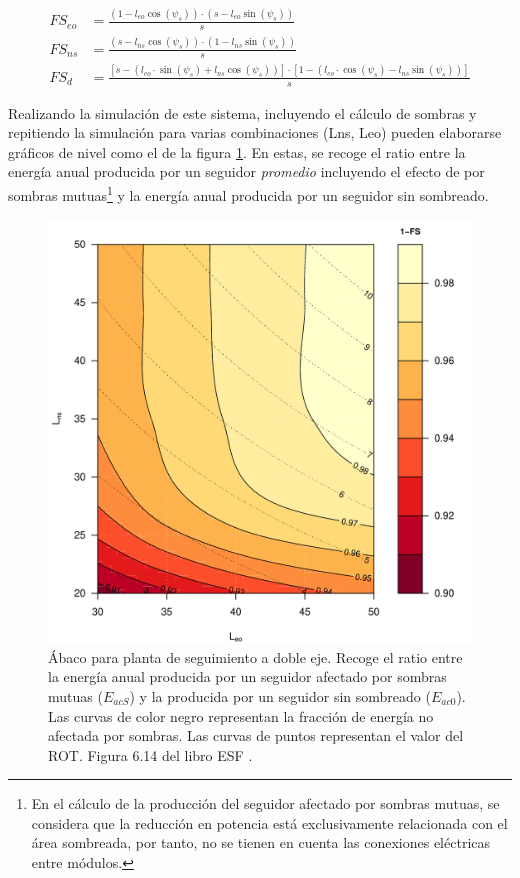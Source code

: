 \begin{align}
FS_{eo} & =\frac{(1-l_{eo}\cos(\psi_{s}))\cdot(s-l_{eo}\sin(\psi_{s}))}{s}\\
FS_{ns} & =\frac{(s-l_{ns}\cos(\psi_{s}))\cdot(1-l_{ns}\sin(\psi_{s}))}{s}\\
FS_{d} & =\frac{\left[s-\left(l_{eo}\cdot\sin(\psi_{s})+l_{ns}\cos(\psi_{s})\right)\right]\cdot\left[1-\left(l_{eo}\cdot\cos(\psi_{s})-l_{ns}\sin(\psi_{s})\right)\right]}{s}
\end{align}

Realizando la simulación de este sistema, incluyendo el cálculo de sombras y repitiendo la simulación para varias combinaciones (Lns, Leo) pueden elaborarse gráficos de nivel como el de la figura \ref{fig:abaco-sombras}. En estas, se recoge el ratio entre la energía anual producida por un seguidor \emph{promedio} incluyendo el efecto de por sombras mutuas\footnote{En el cálculo de la producción del seguidor afectado por sombras mutuas, se considera que la reducción en potencia está exclusivamente relacionada con el área sombreada, por tanto, no se tienen en cuenta las conexiones eléctricas entre módulos.} y la energía anual producida por un seguidor sin sombreado.
\begin{figure}[htbp]
\centering
\includegraphics[scale=0.6]{figuras/AbacoSombras.pdf}
\caption{Ábaco para planta de seguimiento a doble eje. Recoge el ratio entre la energía anual producida por un seguidor afectado por sombras mutuas (\(E_{acS}\)) y la producida por un seguidor sin sombreado (\(E_{ac0}\)). Las curvas de color negro representan la fracción de energía no afectada por sombras. Las curvas de puntos representan el valor del ROT. Figura 6.14 del libro ESF \cite{Perpinan2023}. \label{fig:abaco-sombras}}
\end{figure}

